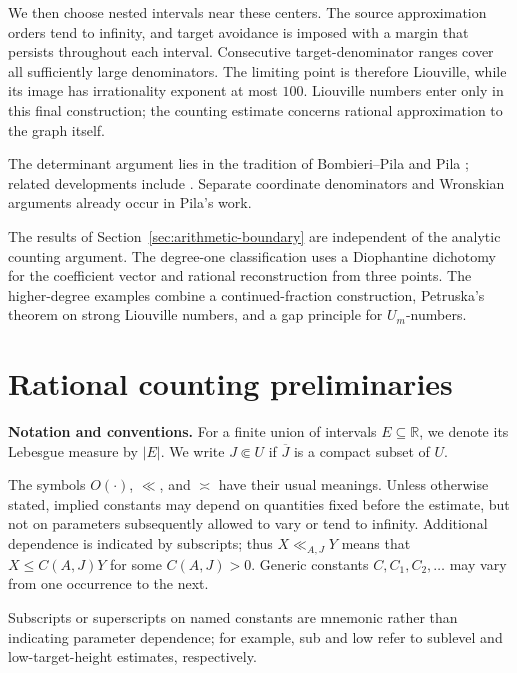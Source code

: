 \documentclass[11pt]{amsart}
\numberwithin{equation}{section}
\theoremstyle{definition}
\theoremstyle{remark}
\newcommand{\R}{\mathbb R}
\begin{document}
We then choose nested intervals near these centers. The source
approximation orders tend to infinity, and target avoidance is
imposed with a margin that persists throughout each interval.
Consecutive target-denominator ranges cover all sufficiently
large denominators. The limiting point is therefore Liouville,
while its image has irrationality exponent at most $100$.
Liouville numbers enter only in this final construction; the
counting estimate concerns rational approximation to the graph
itself.

The determinant argument lies in the tradition of Bombieri--Pila and
Pila \cite{BombieriPila1989,Pila1991,Pila2005}; related developments
include \cite{BeresnevichDickinsonVelani2007,ComteYomdin2018,
Habegger2018,Huang2015,Huxley1994,KleinbockMargulis1998,
PilaWilkie2006,VaughanVelani2006}. Separate coordinate denominators and Wronskian arguments already
occur in Pila's work. 

The results of Section~\ref{sec:arithmetic-boundary} are independent of the analytic counting
argument. The degree-one classification uses a Diophantine
dichotomy for the coefficient vector and rational reconstruction
from three points. The higher-degree examples combine a
continued-fraction construction, Petruska's theorem on strong
Liouville numbers, and a gap principle for $U_m$-numbers.

\section{Rational counting preliminaries}
\label{sec:rational-counting}

\noindent
\textbf{Notation and conventions.} For a finite union of intervals $E\subseteq\R$, we denote its Lebesgue
measure by $|E|$. We write $J\Subset U$ if $\overline J$ is a compact
subset of $U$.

The symbols $O(\cdot)$, $\ll$, and $\asymp$ have their usual meanings.
Unless otherwise stated, implied constants may depend on quantities
fixed before the estimate, but not on parameters subsequently allowed
to vary or tend to infinity. Additional dependence is indicated by
subscripts; thus $X\ll_{A,J}Y$ means that
$X\leq C(A,J)Y$ for some $C(A,J)>0$. Generic constants
$C,C_1,C_2,\ldots$ may vary from one occurrence to the next.

Subscripts or superscripts on named constants are mnemonic rather than
indicating parameter dependence; for example, \textup{sub} and
\textup{low} refer to sublevel and low-target-height estimates,
respectively.
\end{document}
